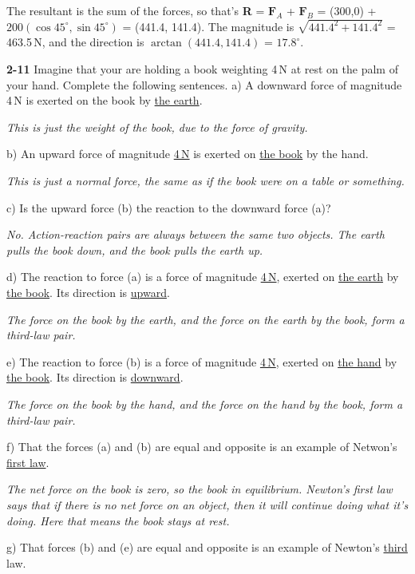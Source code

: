 \documentclass{amsart}
\begin{document}
The resultant is the sum of the forces, so that's \textbf{R} = $\textbf{F}_A$ + $\textbf{F}_B$ = 
(300,0) + $200 (\cos 45^\circ, \sin 45^\circ)$ = (441.4, 141.4).  The magnitude is 
$\sqrt{441.4^2 + 141.4^2}$ = 463.5\,N, and the direction is $\arctan (441.4, 141.4)$ = $17.8^\circ$.

\vspace{\baselineskip}
\noindent
\textbf{2-11} Imagine that your are holding a book weighting 4\,N at rest on the palm of your hand.
Complete the following sentences.\newline
a) A downward force of magnitude 4\,N is exerted on the book by \underline{the earth}.

\textit{This is just the weight of the book, due to the force of gravity.}

\noindent
b) An upward force of magnitude \underline{4\,N} is exerted on \underline{the book} by the hand.

\textit{This is just a normal force, the same as if the book were on a table or something.}

\noindent
c) Is the upward force (b) the reaction to the downward force (a)?

\textit{No.  Action-reaction pairs are always between the same two objects.  The earth pulls the book down,
and the book pulls the earth up.}

\noindent
d) The reaction to force (a) is a force of magnitude \underline{4\,N},
exerted on \underline{the earth} by \underline{the book}.
Its direction is \underline{upward}.

\textit{The force on the book by the earth, and the force on the earth by the book, form a third-law pair.}

\noindent
e) The reaction to force (b) is a force of magnitude \underline{4\,N}, exerted on \underline{the hand}
by \underline{the book}.  Its direction is \underline{downward}.

\textit{The force on the book by the hand, and the force on the hand by the book, form a third-law pair.}

\noindent
f) That the forces (a) and (b) are equal and opposite is an example of Netwon's \underline{first law}.

\textit{The net force on the book is zero, so the book in equilibrium.  Newton's first law says that if 
there is no net force on an object, then it will continue doing what it's doing.  
Here that means the book stays at rest.}

\noindent
g) That forces (b) and (e) are equal and opposite is an example of Newton's \underline{third} law.
\end{document}
